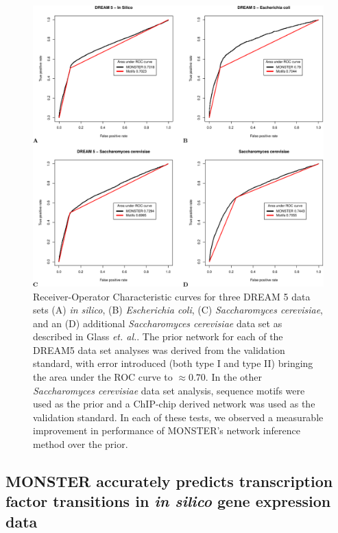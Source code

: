 \begin{figure}
\includegraphics[width=1\linewidth]{figures/SupportingFigure2.pdf}
\caption[ROC curves for network inference in three DREAM 5 data sets]{Receiver-Operator Characteristic curves for three DREAM 5 data sets
(A) \emph{in silico}, (B) \emph{Escherichia coli}, (C) \emph{Saccharomyces cerevisiae}, and an (D) additional \emph{Saccharomyces cerevisiae} data set as described  in Glass \emph{et. al.}\cite{glass2013passing}. The prior network for each of the DREAM5 data set analyses was derived from the validation standard, with error introduced (both type I and type II) bringing the area under the ROC curve to $\approx0.70$. In the other \emph{Saccharomyces cerevisiae} data set analysis, sequence motifs were used as the prior and a ChIP-chip derived network was used as the validation standard. In each of these tests, we observed a measurable improvement in performance of MONSTER's network inference method over the prior.}
\label{fig:Supplement_validation}
\end{figure}


\subsection*{MONSTER accurately predicts transcription factor transitions in \emph{in silico} gene expression data} 

